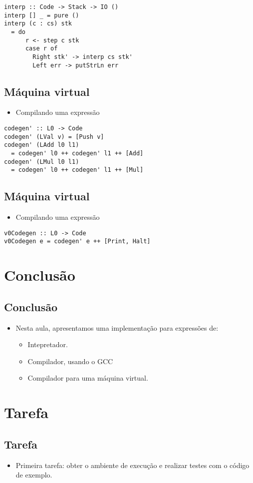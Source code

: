 \documentclass[11pt]{article}
\begin{document}
\begin{verbatim}
interp :: Code -> Stack -> IO () 
interp [] _ = pure ()
interp (c : cs) stk 
  = do 
      r <- step c stk
      case r of 
        Right stk' -> interp cs stk'
        Left err -> putStrLn err 
\end{verbatim}
\subsection*{Máquina virtual}
\label{sec:org1a082ce}

\begin{itemize}
\item Compilando uma expressão
\end{itemize}

\begin{verbatim}
codegen' :: L0 -> Code 
codegen' (LVal v) = [Push v]
codegen' (LAdd l0 l1) 
  = codegen' l0 ++ codegen' l1 ++ [Add]
codegen' (LMul l0 l1) 
  = codegen' l0 ++ codegen' l1 ++ [Mul]
\end{verbatim}
\subsection*{Máquina virtual}
\label{sec:orga0f8a5b}

\begin{itemize}
\item Compilando uma expressão
\end{itemize}

\begin{verbatim}
v0Codegen :: L0 -> Code 
v0Codegen e = codegen' e ++ [Print, Halt]
\end{verbatim}
\section*{Conclusão}
\label{sec:org370af6f}

\subsection*{Conclusão}
\label{sec:orgbbb1d90}

\begin{itemize}
\item Nesta aula, apresentamos uma implementação para expressões de:
\begin{itemize}
\item Intepretador.
\item Compilador, usando o GCC
\item Compilador para uma máquina virtual.
\end{itemize}
\end{itemize}
\section*{Tarefa}
\label{sec:orgc52851e}

\subsection*{Tarefa}
\label{sec:org7cfe358}

\begin{itemize}
\item Primeira tarefa: obter o ambiente de execução e realizar testes com o código de exemplo.
\end{itemize}
\end{document}
